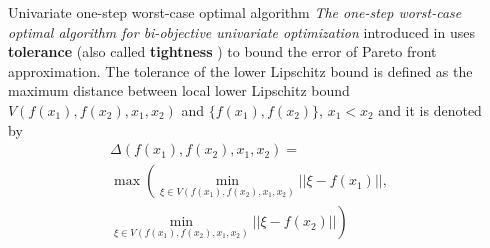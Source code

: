 \documentclass[final]{beamer}
\newlength{\sepwid}
\newlength{\onecolwid}
\newlength{\twocolwid}
\begin{document}
\begin{frame}[t]
\begin{columns}[t]

    \begin{column}{\sepwid}\end{column}			%
    \begin{column}{\twocolwid}							%
      \begin{columns}[t,totalwidth=\twocolwid]	%
        \begin{column}{\onecolwid}\vspace{-.69in}
    \begin{block}{Univariate one-step worst-case optimal algorithm}
        \textit{The one-step worst-case optimal algorithm for bi-objective univariate
        optimization} introduced in \cite{ub} uses \textbf{tolerance} (also
        called \textbf{tightness} \cite{bbCB}) to bound
        the error of Pareto front approximation.
        The tolerance of the lower Lipschitz bound is defined as the maximum distance between local lower
        Lipschitz bound $V(f(x_1), f(x_2), x_1, x_2)$ and $\{f(x_1),
        f(x_2)\}$, $x_1 < x_2$ and it is denoted by
        \begin{multline}\label{tolerance}
            \Delta(f(x_1), f(x_2), x_1, x_2) = \\
            \max \left( \min_{\xi \in
                V(f(x_1),f(x_2), x_1, x_2)}\right. ||\xi - f(x_1)||,\\
                \left.\min_{\xi \in V(f(x_1), f(x_2), x_1, x_2)} ||\xi - f(x_2)||\right)
        \end{multline}


\end{block}
\end{column}
\end{columns}
\end{column}
\end{columns}
\end{frame}
\end{document}
